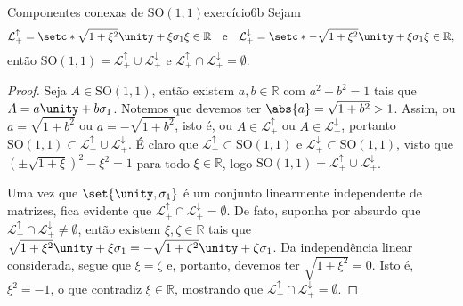 \begin{proposition}{Componentes conexas de \(\mathrm{SO}(1,1)\)}{exercício6b}
    Sejam
    \begin{equation*}
        \mathcal{L}_+^\uparrow = \setc*{\sqrt{1 + \xi^2}\unity + \xi \sigma_1}{\xi \in \mathbb{R}}
        \quad\text{e}\quad
        \mathcal{L}_+^\downarrow = \setc*{-\sqrt{1 + \xi^2}\unity + \xi \sigma_1}{\xi \in \mathbb{R}},
    \end{equation*}
    então \(\mathrm{SO}(1,1) = \mathcal{L}_+^\uparrow \cup \mathcal{L}_+^\downarrow\) e \(\mathcal{L}_+^\uparrow \cap \mathcal{L}_+^\downarrow = \emptyset\).
\end{proposition}
\begin{proof}
    Seja \(A \in \mathrm{SO}(1,1)\), então existem \(a, b \in \mathbb{R}\) com \(a^2 - b^2 = 1\) tais que \(A = a \unity + b \sigma_1\). Notemos que devemos ter \(\abs{a} = \sqrt{1 + b^2} > 1\). Assim, ou \(a = \sqrt{1 + b^2}\) ou \(a = -\sqrt{1 + b^2}\), isto é, ou \(A \in \mathcal{L}_+^\uparrow\) ou \(A \in \mathcal{L}_+^\downarrow\), portanto \(\mathrm{SO}(1,1) \subset \mathcal{L}_+^\uparrow \cup \mathcal{L}_+^\downarrow\). É claro que \(\mathcal{L}_+^\uparrow\subset \mathrm{SO}(1,1)\) e \(\mathcal{L}_+^\downarrow \subset \mathrm{SO}(1,1)\), visto que \((\pm\sqrt{1 + \xi})^2 - \xi^2 = 1\) para todo \(\xi\in \mathbb{R}\), logo \(\mathrm{SO}(1,1) = \mathcal{L}_+^\uparrow \cup \mathcal{L}_+^\downarrow\).

    Uma vez que \(\set{\unity, \sigma_1}\) é um conjunto linearmente independente de matrizes, fica evidente que \(\mathcal{L}_+^\uparrow \cap \mathcal{L}_+^\downarrow = \emptyset\). De fato, suponha por absurdo que \(\mathcal{L}_+^\uparrow \cap \mathcal{L}_+^\downarrow \neq \emptyset\), então existem \(\xi, \zeta \in \mathbb{R}\) tais que \(\sqrt{1 + \xi^2} \unity + \xi \sigma_1 = -\sqrt{1 + \zeta^2} \unity + \zeta \sigma_1\). Da independência linear considerada, segue que \(\xi = \zeta\) e, portanto, devemos ter \(\sqrt{1 + \xi^2} = 0\). Isto é, \(\xi^2 = -1\), o que contradiz \(\xi \in \mathbb{R}\), mostrando que \(\mathcal{L}_+^\uparrow \cap \mathcal{L}_+^\downarrow = \emptyset\).
\end{proof}

